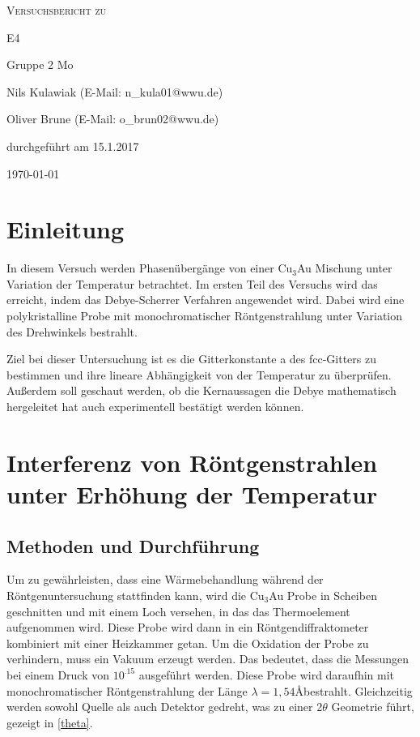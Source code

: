 \documentclass[
	a4paper,
	12pt,
	pagesize,
	ngerman
]{scrartcl}
\begin{document}
\begin{titlepage}
	\centering
	{\scshape\LARGE Versuchsbericht zu \par}
	\vspace{1cm}
	{\scshape\huge E4\par}
	\vspace{2.5cm}
	{\LARGE Gruppe 2 Mo\par}
	\vspace{0.5cm}
	{\large Nils Kulawiak (E-Mail: n\_kula01@wwu.de) \par}
	{\large Oliver Brune (E-Mail: o\_brun02@wwu.de) \par}
	\vfill
	durchgeführt am 15.1.2017\par
	
	\vfill

	{\large \today\par}
\end{titlepage}


\tableofcontents
	
	
\newpage
\section{Einleitung}
In diesem Versuch werden Phasenübergänge von einer Cu$_{3}$Au Mischung unter Variation der Temperatur betrachtet. Im ersten Teil des Versuchs wird das erreicht, indem das Debye-Scherrer Verfahren angewendet wird. Dabei wird eine polykristalline Probe mit monochromatischer Röntgenstrahlung unter Variation des Drehwinkels bestrahlt.

Ziel bei dieser Untersuchung ist es die Gitterkonstante a des fcc-Gitters zu bestimmen und ihre lineare Abhängigkeit von der Temperatur zu überprüfen. Außerdem soll geschaut werden, ob die Kernaussagen die Debye mathematisch hergeleitet hat auch experimentell bestätigt werden können.
\section{Interferenz von Röntgenstrahlen unter Erhöhung der Temperatur}
\subsection{Methoden und Durchführung}
Um zu gewährleisten, dass eine Wärmebehandlung während der Röntgenuntersuchung stattfinden kann, wird die Cu$_{3}$Au Probe in Scheiben geschnitten und mit einem Loch versehen, in das das Thermoelement aufgenommen wird. Diese Probe wird dann in ein Röntgendiffraktometer kombiniert mit einer Heizkammer getan. Um die Oxidation der Probe zu verhindern, muss ein Vakuum erzeugt werden. Das bedeutet, dass die Messungen bei einem Druck von $10^{.15}$ ausgeführt werden. Diese Probe wird daraufhin mit monochromatischer Röntgenstrahlung der Länge $\lambda = 1,54$\AA bestrahlt. Gleichzeitig werden sowohl Quelle als auch Detektor gedreht, was zu einer 2$\theta$ Geometrie führt, gezeigt in \cref{theta}.
\end{document}
